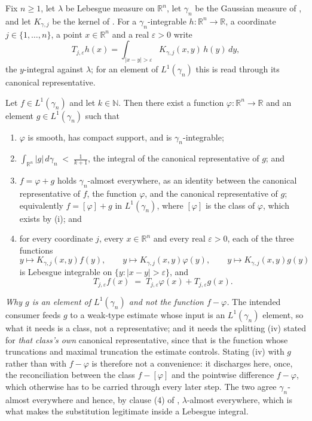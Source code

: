 \begin{lemma}
Fix $n \geq 1$, let $\lambda$ be Lebesgue measure on $\mathbb{R}^n$, let
$\gamma_n$ be the Gaussian measure of , and let
$K_{\gamma,j}$ be the kernel of .  For a
$\gamma_n$-integrable $h : \mathbb{R}^n \to \mathbb{R}$, a coordinate
$j \in \{1,\ldots,n\}$, a point $x \in \mathbb{R}^n$ and a real
$\varepsilon > 0$ write
\[
  T_{j,\varepsilon}h(x)
    = \int_{|x-y|>\varepsilon}K_{\gamma,j}(x,y)\,h(y)\,dy ,
\]
the $y$-integral against $\lambda$; for an element of $L^1(\gamma_n)$ this is
read through its canonical representative.

Let $f \in L^1(\gamma_n)$ and let $k \in \mathbb{N}$.  Then there exist a
function $\varphi : \mathbb{R}^n \to \mathbb{R}$ and an element
$g \in L^1(\gamma_n)$ such that
\begin{enumerate}
\item[(i)] $\varphi$ is smooth, has compact support, and is
$\gamma_n$-integrable;
\item[(ii)] $\displaystyle\int_{\mathbb{R}^n}|g|\,d\gamma_n
  \;<\; \frac1{k+1}$, the integral of the canonical representative of $g$; and
\item[(iii)] $f = \varphi + g$ holds $\gamma_n$-almost everywhere, as an
identity between the canonical representative of $f$, the function $\varphi$,
and the canonical representative of $g$; equivalently $f = [\varphi] + g$ in
$L^1(\gamma_n)$, where $[\varphi]$ is the class of $\varphi$, which exists by
(i); and
\item[(iv)] for every coordinate $j$, every $x \in \mathbb{R}^n$ and every
real $\varepsilon > 0$, each of the three functions
\[
  y \mapsto K_{\gamma,j}(x,y)f(y), \qquad
  y \mapsto K_{\gamma,j}(x,y)\varphi(y), \qquad
  y \mapsto K_{\gamma,j}(x,y)g(y)
\]
is Lebesgue integrable on $\{y : |x-y| > \varepsilon\}$, and
\[
  T_{j,\varepsilon}f(x)
    \;=\; T_{j,\varepsilon}\varphi(x) + T_{j,\varepsilon}g(x) .
\]
\end{enumerate}

\emph{Why $g$ is an element of $L^1(\gamma_n)$ and not the function
$f - \varphi$.}  The intended consumer feeds $g$ to a weak-type estimate whose
input is an $L^1(\gamma_n)$ element, so what it needs is a class, not a
representative; and it needs the splitting (iv) stated for \emph{that class's
own} canonical representative, since that is the function whose truncations
and maximal truncation the estimate controls.  Stating (iv) with $g$ rather
than with $f - \varphi$ is therefore not a convenience: it discharges here,
once, the reconciliation between the class $f - [\varphi]$ and the pointwise
difference $f - \varphi$, which otherwise has to be carried through every later
step.  The two agree $\gamma_n$-almost everywhere and hence, by clause (4) of
, $\lambda$-almost everywhere, which is
what makes the substitution legitimate inside a Lebesgue integral.


\end{lemma}
